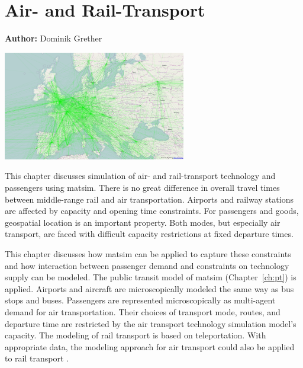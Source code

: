 \chapter{Air- and Rail-Transport}
\label{ch:air}

\hfill \textbf{Author:} Dominik Grether

\begin{center} \includegraphics[width=0.6\textwidth, angle=0]{extending/figures/air/air_network_europe_osm} \end{center}



This chapter discusses simulation of air- and rail-transport technology and passengers using \gls{matsim}. 
There is no great difference in overall travel times between middle-range rail and air transportation. 
Airports and railway stations are affected by capacity and opening time constraints. 
For passengers and goods, geospatial location is an important property. 
Both modes, but especially air transport, are faced with difficult capacity restrictions at fixed departure times. 

This chapter discusses how \gls{matsim} can be applied to capture these constraints and how interaction between passenger demand and constraints on technology supply can be modeled. 
The public transit model of \gls{matsim} (Chapter~\ref{ch:pt}) is applied. %
Airports and aircraft are microscopically modeled the same way as bus stops and buses. 
Passengers are represented microscopically as multi-agent demand for air transportation. 
Their choices of transport mode, routes, and departure time are restricted by the air transport technology simulation model's capacity. 
The modeling of rail transport is based on teleportation. 
With appropriate data, the modeling approach for air transport could also be applied to rail transport \citep{Quick2012BARailTraffic}.  

